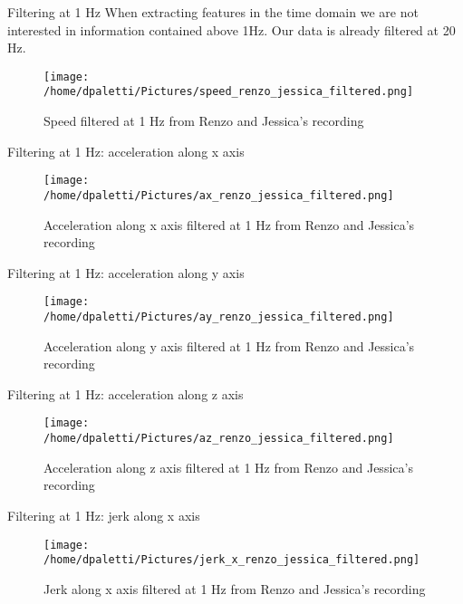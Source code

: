 \documentclass[presentation]{beamer}
\begin{document}
\begin{frame}[label={sec:orgd24d33b}]{Filtering at 1 Hz}
When extracting features in the \alert{time domain} we are not interested in information contained above 1Hz. \newline
Our data is already filtered at 20 Hz.
\begin{figure}[htbp]
\centering
\texttt{[image: /home/dpaletti/Pictures/speed\_renzo\_jessica\_filtered.png]}
\caption{\label{fig:speed_alberto_jessica}Speed filtered at 1 Hz from Renzo and Jessica's recording}
\end{figure}
\end{frame}
\begin{frame}[label={sec:orgecdddb5}]{Filtering at 1 Hz: acceleration along x axis}
\begin{figure}[htbp]
\centering
\texttt{[image: /home/dpaletti/Pictures/ax\_renzo\_jessica\_filtered.png]}
\caption{\label{fig:speed_alberto_jessica}Acceleration along x axis filtered at 1 Hz from Renzo and Jessica's recording}
\end{figure}
\end{frame}
\begin{frame}[label={sec:org00245b3}]{Filtering at 1 Hz: acceleration along y axis}
\begin{figure}[htbp]
\centering
\texttt{[image: /home/dpaletti/Pictures/ay\_renzo\_jessica\_filtered.png]}
\caption{\label{fig:speed_alberto_jessica}Acceleration along y axis filtered at 1 Hz from Renzo and Jessica's recording}
\end{figure}
\end{frame}
\begin{frame}[label={sec:org53a1010}]{Filtering at 1 Hz: acceleration along z axis}
\begin{figure}[htbp]
\centering
\texttt{[image: /home/dpaletti/Pictures/az\_renzo\_jessica\_filtered.png]}
\caption{\label{fig:speed_alberto_jessica}Acceleration along z axis filtered at 1 Hz from Renzo and Jessica's recording}
\end{figure}
\end{frame}
\begin{frame}[label={sec:org5a3c044}]{Filtering at 1 Hz: jerk along x axis}
\begin{figure}[htbp]
\centering
\texttt{[image: /home/dpaletti/Pictures/jerk\_x\_renzo\_jessica\_filtered.png]}
\caption{\label{fig:speed_alberto_jessica}Jerk along x axis filtered at 1 Hz from Renzo and Jessica's recording}
\end{figure}
\end{frame}
\end{document}
